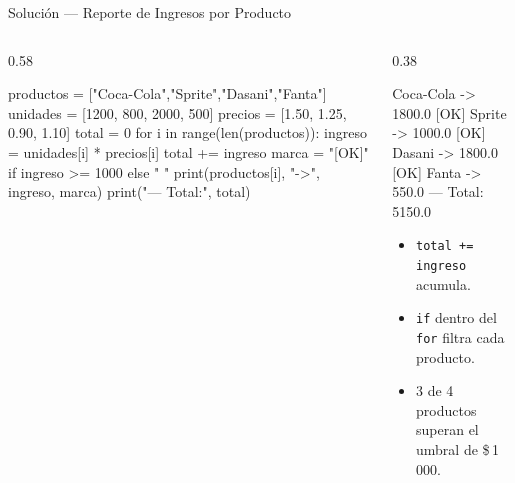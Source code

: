 \documentclass[aspectratio=169, 11pt]{beamer}
\begin{document}
\begin{frame}[fragile,shrink=30]{Solución --- Reporte de Ingresos por Producto}
  \vspace{-6pt}
  \begin{columns}[T]
    \begin{column}{0.58\textwidth}
      \begin{pyblocknum}
productos = ["Coca-Cola","Sprite","Dasani","Fanta"]
unidades  = [1200, 800, 2000, 500]
precios   = [1.50, 1.25, 0.90, 1.10]
total = 0
for i in range(len(productos)):
    ingreso = unidades[i] * precios[i]
    total  += ingreso
    marca = "[OK]" if ingreso >= 1000 else "   "
    print(productos[i], "->", ingreso, marca)
print("--- Total:", total)
      \end{pyblocknum}
    \end{column}

    \begin{column}{0.38\textwidth}
      \vspace{4pt}
      \begin{outputblock}
Coca-Cola -> 1800.0 [OK]
Sprite    -> 1000.0 [OK]
Dasani    -> 1800.0 [OK]
Fanta     ->  550.0
--- Total: 5150.0
      \end{outputblock}

      \vspace{4pt}
      {\footnotesize\color{textMuted}
      \begin{itemize}\setlength{\itemsep}{4pt}
        \item[{\color{codeGreen}\scriptsize\faCheck}]
          \texttt{total += ingreso} acumula.
        \item[{\color{codeGreen}\scriptsize\faCheck}]
          \texttt{if} dentro del \texttt{for}
          filtra cada producto.
        \item[{\color{arcaRed}\scriptsize\faLightbulb}]
          3 de 4 productos superan
          el umbral de \$\,1\,000.
      \end{itemize}
      }
    \end{column}
  \end{columns}
\end{frame}
\end{document}
